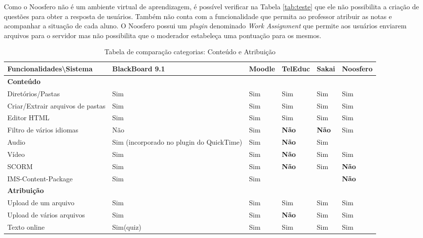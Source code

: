 Como o Noosfero não é um ambiente virtual de aprendizagem, é possível verificar na Tabela \ref{tab:teste} que ele não possibilita a criação de questões para obter a resposta de usuários. Também não conta com a funcionalidade que permita ao professor atribuir as notas e acompanhar a situação de cada aluno. O Noosfero possui um \textit{plugin} denominado \textit{Work Assignment} que permite aos usuários enviarem arquivos para o servidor mas não possibilita que o moderador estabeleça uma pontuação para os mesmos.

\begin{landscape}
\begin{table}[H]
\begin{center}
\begin{tabular}{|@{}p{5.5cm}|p{3.5cm}|p{3.5cm}|p{3.5cm}|p{3.5cm}|p{3.5cm}@{}|}
\hline
\textbf{Funcionalidades\textbackslash Sistema} & \textbf{BlackBoard 9.1} & \textbf{Moodle} & \textbf{TelEduc} & \textbf{Sakai} & \textbf{Noosfero}\\ \hline
\textbf{Conteúdo} &  &  &  &  &  \\
Diretórios/Pastas & Sim & Sim & Sim & Sim & Sim \\
Criar/Extrair arquivos de pastas & Sim & Sim & Sim & Sim & Sim \\
Editor HTML & Sim & Sim & Sim & Sim & Sim \\
Filtro de vários idiomas & Não & Sim & \textbf{Não} & \textbf{Não} & Sim \\
Audio & Sim {\tiny (incorporado no plugin do QuickTime)} & Sim & \textbf{Não} & Sim &  \\
Vídeo & Sim & Sim & \textbf{Não} & Sim & Sim \\
SCORM & Sim & Sim & \textbf{Não} & Sim & \textbf{Não} \\
IMS-Content-Package & Sim & Sim &  &  & \textbf{Não} \\
\textbf{Atribuição} &  &  &  &  &  \\
Upload de um arquivo & Sim & Sim & Sim & Sim & Sim \\
Upload de vários arquivos & Sim & Sim & \textbf{Não} & Sim & Sim \\
Texto online & Sim(quiz) & Sim & Sim & Sim & Sim \\ \hline
\end{tabular}
\caption{Tabela de comparação categorias: Conteúdo e Atribuição}
\label{tab:conteudo-atribuicao}
\end{center}
\end{table}


\end{landscape}
